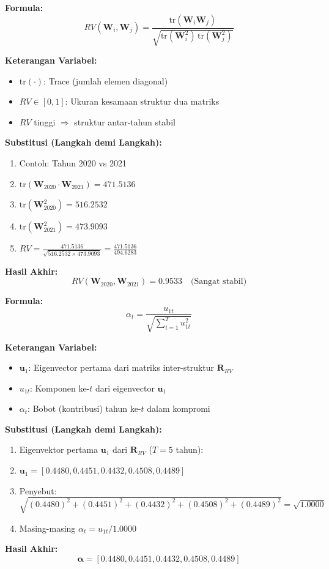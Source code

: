 \documentclass[11pt,a4paper]{article}
\begin{document}
\begin{tcolorbox}[formula_box, title={14. Koefisien RV (Inter-Struktur)}]
\textbf{Formula:}
\[ RV(\mathbf{W}_i,\mathbf{W}_j) = \frac{\text{tr}(\mathbf{W}_i\mathbf{W}_j)}{\sqrt{\text{tr}(\mathbf{W}_i^2)\,\text{tr}(\mathbf{W}_j^2)}} \]

\textbf{Keterangan Variabel:}
\begin{itemize}
  \item $\text{tr}(\cdot)$: Trace (jumlah elemen diagonal)
  \item $RV \in [0,1]$: Ukuran kesamaan struktur dua matriks
  \item $RV$ tinggi $\Rightarrow$ struktur antar-tahun stabil
\end{itemize}

\textbf{Substitusi (Langkah demi Langkah):}
\begin{enumerate}
  \item Contoh: Tahun 2020 vs 2021
  \item $\text{tr}(\mathbf{W}_{2020} \cdot \mathbf{W}_{2021}) = 471.5136$
  \item $\text{tr}(\mathbf{W}_{2020}^2) = 516.2532$
  \item $\text{tr}(\mathbf{W}_{2021}^2) = 473.9093$
  \item $RV = \frac{471.5136}{\sqrt{516.2532 \times 473.9093}} = \frac{471.5136}{494.6283}$
\end{enumerate}

\textbf{Hasil Akhir:}
\[ RV(\mathbf{W}_{2020}, \mathbf{W}_{2021}) = 0.9533 \quad \text{(Sangat stabil)} \]
\end{tcolorbox}

\begin{tcolorbox}[formula_box, title={15. Bobot Optimal ($\alpha_t$)}]
\textbf{Formula:}
\[ \alpha_t = \frac{u_{1t}}{\sqrt{\sum_{t=1}^{T} u_{1t}^2}} \]

\textbf{Keterangan Variabel:}
\begin{itemize}
  \item $\mathbf{u}_1$: Eigenvector pertama dari matriks inter-struktur $\mathbf{R}_{RV}$
  \item $u_{1t}$: Komponen ke-$t$ dari eigenvector $\mathbf{u}_1$
  \item $\alpha_t$: Bobot (kontribusi) tahun ke-$t$ dalam kompromi
\end{itemize}

\textbf{Substitusi (Langkah demi Langkah):}
\begin{enumerate}
  \item Eigenvektor pertama $\mathbf{u}_1$ dari $\mathbf{R}_{RV}$ ($T=5$ tahun):
  \item $\mathbf{u}_1 = [0.4480, 0.4451, 0.4432, 0.4508, 0.4489]$
  \item Penyebut: $\sqrt{(0.4480)^2 + (0.4451)^2 + (0.4432)^2 + (0.4508)^2 + (0.4489)^2} = \sqrt{1.0000}$
  \item Masing-masing $\alpha_t = u_{1t} / 1.0000$
\end{enumerate}

\textbf{Hasil Akhir:}
\[ \boldsymbol{\alpha} = [0.4480, 0.4451, 0.4432, 0.4508, 0.4489] \]
\end{tcolorbox}
\end{document}
